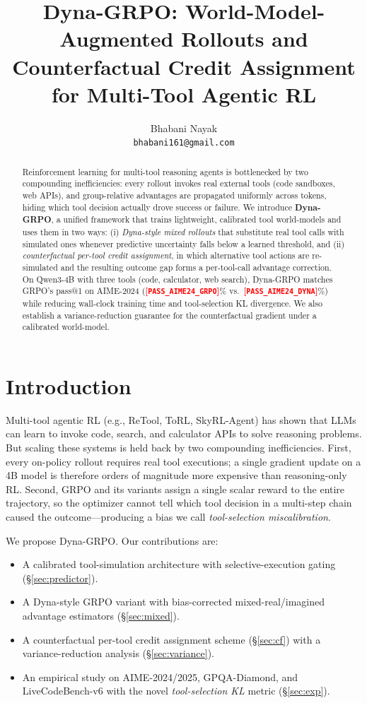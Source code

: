 \documentclass{article}
\title{Dyna-GRPO: World-Model-Augmented Rollouts and Counterfactual Credit Assignment for Multi-Tool Agentic RL}
\author{%
  Bhabani Nayak \\
  \texttt{bhabani161@gmail.com} \\
}
\newcommand{\PLACEHOLDER}[1]{\textcolor{red}{\textbf{[\texttt{#1}]}}}
\begin{document}
\maketitle

\begin{abstract}
Reinforcement learning for multi-tool reasoning agents is bottlenecked by two compounding inefficiencies: every rollout invokes real external tools (code sandboxes, web APIs), and group-relative advantages are propagated uniformly across tokens, hiding which tool decision actually drove success or failure. We introduce \textbf{Dyna-GRPO}, a unified framework that trains lightweight, calibrated tool world-models and uses them in two ways: (i) \emph{Dyna-style mixed rollouts} that substitute real tool calls with simulated ones whenever predictive uncertainty falls below a learned threshold, and (ii) \emph{counterfactual per-tool credit assignment}, in which alternative tool actions are re-simulated and the resulting outcome gap forms a per-tool-call advantage correction. On Qwen3-4B with three tools (code, calculator, web search), Dyna-GRPO matches GRPO's pass@1 on AIME-2024 (\PLACEHOLDER{PASS_AIME24_GRPO}\% vs.\ \PLACEHOLDER{PASS_AIME24_DYNA}\%) while reducing wall-clock training time and tool-selection KL divergence. We also establish a variance-reduction guarantee for the counterfactual gradient under a calibrated world-model.
\end{abstract}

\section{Introduction}\label{sec:intro}
Multi-tool agentic RL (e.g., ReTool, ToRL, SkyRL-Agent) has shown that LLMs can learn to invoke code, search, and calculator APIs to solve reasoning problems. But scaling these systems is held back by two compounding inefficiencies. First, every on-policy rollout requires real tool executions; a single gradient update on a 4B model is therefore orders of magnitude more expensive than reasoning-only RL. Second, GRPO and its variants assign a single scalar reward to the entire trajectory, so the optimizer cannot tell which tool decision in a multi-step chain caused the outcome---producing a bias we call \emph{tool-selection miscalibration}.

We propose Dyna-GRPO. Our contributions are:
\begin{itemize}
    \item A calibrated tool-simulation architecture with selective-execution gating (\S\ref{sec:predictor}).
    \item A Dyna-style GRPO variant with bias-corrected mixed-real/imagined advantage estimators (\S\ref{sec:mixed}).
    \item A counterfactual per-tool credit assignment scheme (\S\ref{sec:cf}) with a variance-reduction analysis (\S\ref{sec:variance}).
    \item An empirical study on AIME-2024/2025, GPQA-Diamond, and LiveCodeBench-v6 with the novel \emph{tool-selection KL} metric (\S\ref{sec:exp}).
\end{itemize}
\end{document}
